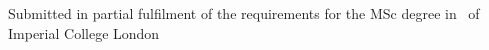 \begin{titlepage}
\vfill %
Submitted in partial fulfilment of the requirements for the MSc degree in
\degreetype~of Imperial College London\\[0.5cm]

\makeatletter
\@date 
\makeatother


\end{titlepage}
